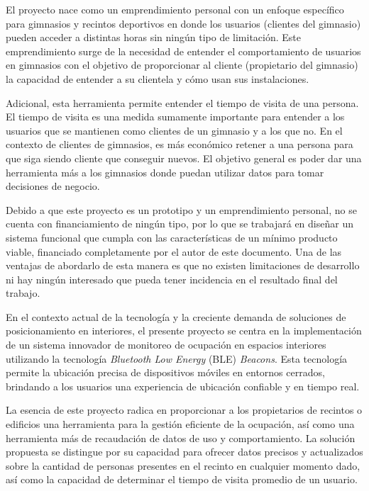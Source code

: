 \documentclass[
11pt, %
]{charter}
\begin{document}
El proyecto nace como un emprendimiento personal con un enfoque específico para gimnasios y recintos deportivos en donde los usuarios (clientes del gimnasio) pueden acceder a distintas horas sin ningún tipo de limitación. Este emprendimiento surge de la necesidad de entender el comportamiento de usuarios en gimnasios con el objetivo de proporcionar al cliente (propietario del gimnasio) la capacidad de entender a su clientela y cómo usan sus instalaciones. 

Adicional, esta herramienta permite entender el tiempo de visita de una persona. El tiempo de visita es una medida sumamente importante para entender a los usuarios que se mantienen como clientes de un gimnasio y a los que no. En el contexto de clientes de gimnasios, es más económico retener a una persona para que siga siendo cliente que conseguir nuevos. El objetivo general es poder dar una herramienta más a los gimnasios donde puedan utilizar datos para tomar decisiones de negocio.

Debido a que este proyecto es un prototipo y un emprendimiento personal, no se cuenta con financiamiento de ningún tipo, por lo que se trabajará en diseñar un sistema funcional que cumpla con las características de un mínimo producto viable, financiado completamente por el autor de este documento. Una de las ventajas de abordarlo de esta manera es que no existen limitaciones de desarrollo ni hay ningún interesado que pueda tener incidencia en el resultado final del trabajo.

En el contexto actual de la tecnología y la creciente demanda de soluciones de posicionamiento en interiores, el presente proyecto se centra en la implementación de un sistema innovador de monitoreo de ocupación en espacios interiores utilizando la tecnología \textit{Bluetooth Low Energy} (BLE) \textit{Beacons}. Esta tecnología permite la ubicación precisa de dispositivos móviles en entornos cerrados, brindando a los usuarios una experiencia de ubicación confiable y en tiempo real. 

La esencia de este proyecto radica en proporcionar a los propietarios de recintos o edificios una herramienta para la gestión eficiente de la ocupación, así como una herramienta más de recaudación de datos de uso y comportamiento. La solución propuesta se distingue por su capacidad para ofrecer datos precisos y actualizados sobre la cantidad de personas presentes en el recinto en cualquier momento dado, así como la capacidad de determinar el tiempo de visita promedio de un usuario.
\end{document}
